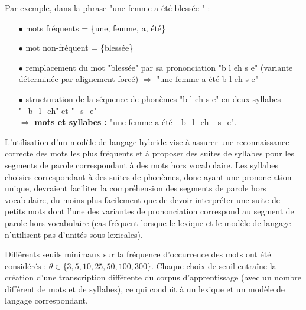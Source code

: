 \documentclass[10pt,a4paper,twoside]{article}
\begin{document}
Par exemple, dans la phrase "une femme a été blessée " : 
\begin{itemize}										 
\item[$\bullet$] mots fréquents = \{une, femme, a, été\}				
\item[$\bullet$] mot non-fréquent = \{blessée\}					
\item[$\bullet$] remplacement du mot "blessée" par sa prononciation "b l eh s e" (variante déterminée par alignement forcé) $\Rightarrow$  "une \quad femme \quad a  \quad été \quad b \quad  l \quad eh \quad s  \quad e"  
\item[$\bullet$] structuration de la séquence de phonèmes  "b l eh s e" en deux syllabes "\_b\_l\_eh" et "\_s\_e"  \vspace{0.1cm} \\
\hspace{0.1cm} \vspace{0.1cm} $\Rightarrow$  {\bf mots et syllabes :} "une \quad femme \quad a \quad été \quad  \_b\_l\_eh \quad \_s\_e".
\end{itemize}	


L'utilisation d'un modèle de langage hybride vise à assurer une reconnaissance correcte des mots les plus fréquents et à proposer des suites de syllabes pour les segments de parole correspondant à des mots hors vocabulaire. Les syllabes choisies correspondant à des suites de phonèmes, donc ayant une prononciation unique, devraient faciliter la compréhension des segments de parole hors vocabulaire, du moins plus facilement que de devoir interpréter une suite de petits mots dont l’une des variantes de prononciation correspond au segment de parole hors vocabulaire (cas fréquent lorsque le lexique et le modèle de langage n’utilisent pas d’unités sous-lexicales).


Différents seuils minimaux sur la fréquence d'occurrence des mots ont été considérés : $\theta \in \{ 3, 5, 10, 25, 50, 100, 300 \}$.
Chaque choix de seuil entraîne la création d'une transcription différente du corpus d'apprentissage (avec un nombre différent de mots et de syllabes), ce qui conduit à un lexique et un modèle de langage correspondant.
\end{document}
